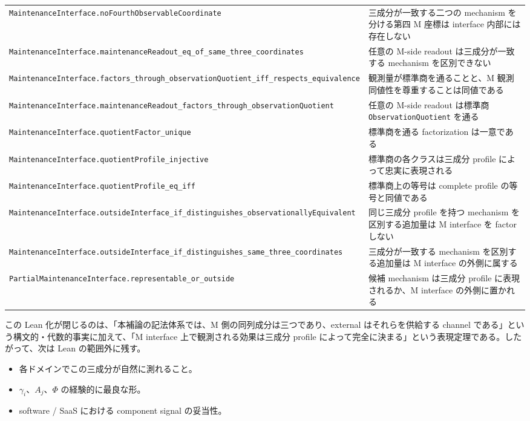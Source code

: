 \documentclass[12pt,a4paper]{article}
\begin{document}
{\begin{longtable}[]{@{}
  >{\raggedright\arraybackslash}p{}
  >{\raggedright\arraybackslash}p{}@{}}
\texttt{MaintenanceInterface.noFourthObservableCoordinate} & 三成分が一致する二つの mechanism を分ける第四 M 座標は interface 内部には存在しない \\
\texttt{MaintenanceInterface.maintenanceReadout\_eq\_of\_same\_three\_coordinates} & 任意の M-side readout は三成分が一致する mechanism を区別できない \\
\texttt{MaintenanceInterface.factors\_through\_observationQuotient\_iff\_respects\_equivalence} & 観測量が標準商を通ることと、M 観測同値性を尊重することは同値である \\
\texttt{MaintenanceInterface.maintenanceReadout\_factors\_through\_observationQuotient} & 任意の M-side readout は標準商 \texttt{ObservationQuotient} を通る \\
\texttt{MaintenanceInterface.quotientFactor\_unique} & 標準商を通る factorization は一意である \\
\texttt{MaintenanceInterface.quotientProfile\_injective} & 標準商の各クラスは三成分 profile によって忠実に表現される \\
\texttt{MaintenanceInterface.quotientProfile\_eq\_iff} & 標準商上の等号は complete profile の等号と同値である \\
\texttt{MaintenanceInterface.outsideInterface\_if\_distinguishes\_observationallyEquivalent} & 同じ三成分 profile を持つ mechanism を区別する追加量は M interface を factor しない \\
\texttt{MaintenanceInterface.outsideInterface\_if\_distinguishes\_same\_three\_coordinates} & 三成分が一致する mechanism を区別する追加量は M interface の外側に属する \\
\texttt{PartialMaintenanceInterface.representable\_or\_outside} & 候補 mechanism は三成分 profile に表現されるか、M interface の外側に置かれる \\
\end{longtable}
}

この Lean 化が閉じるのは、「本補論の記法体系では、M 側の同列成分は三つであり、external はそれらを供給する channel である」という構文的・代数的事実に加えて、「M interface 上で観測される効果は三成分 profile によって完全に決まる」という表現定理である。したがって、次は Lean の範囲外に残す。

\begin{itemize}
\tightlist
\item
  各ドメインでこの三成分が自然に測れること。
\item
  \(\gamma_i\)、\(A_j\)、\(\Phi\) の経験的に最良な形。
\item
  software / SaaS における component signal の妥当性。
\end{itemize}
\end{document}
